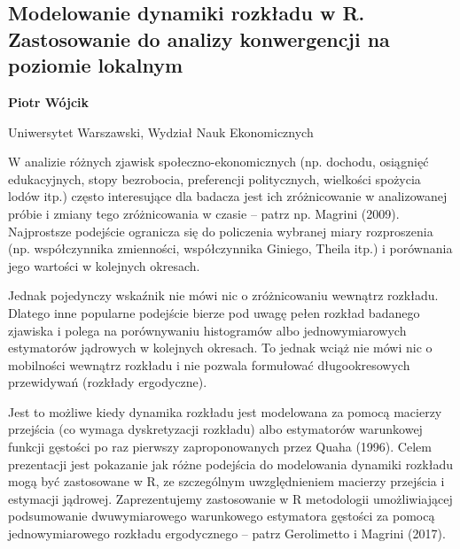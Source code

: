 \documentclass[\main/boa.tex]{subfiles}
\begin{document}
\subsection{Modelowanie dynamiki rozkładu w R. Zastosowanie do analizy konwergencji na poziomie lokalnym}

\begin{minipage}{0.915\textwidth}
	\centering
  {\bf {} Piotr Wójcik}
\end{minipage}


\begin{affiliations}
\begin{minipage}{0.915\textwidth}
\centering
Uniwersytet Warszawski, Wydział Nauk Ekonomicznych  \\[-2pt]
\end{minipage}
\end{affiliations}

\vskip 0.3cm

  W analizie różnych zjawisk społeczno-ekonomicznych (np. dochodu, osiągnięć edukacyjnych, stopy bezrobocia, preferencji politycznych, wielkości spożycia lodów itp.) często interesujące dla badacza jest ich zróżnicowanie w analizowanej próbie i zmiany tego zróżnicowania w czasie – patrz np. Magrini (2009). Najprostsze podejście ogranicza się do policzenia wybranej miary rozproszenia (np. współczynnika zmienności, współczynnika Giniego, Theila itp.) i porównania jego wartości w kolejnych okresach.
  
  Jednak pojedynczy wskaźnik nie mówi nic o zróżnicowaniu wewnątrz rozkładu. Dlatego inne popularne podejście bierze pod uwagę pełen rozkład badanego zjawiska i polega na porównywaniu histogramów albo jednowymiarowych estymatorów jądrowych w kolejnych okresach. To jednak wciąż nie mówi nic o mobilności wewnątrz rozkładu i nie pozwala formułować długookresowych przewidywań (rozkłady ergodyczne).
  
  Jest to możliwe kiedy dynamika rozkładu jest modelowana za pomocą macierzy przejścia (co wymaga dyskretyzacji rozkładu) albo estymatorów warunkowej funkcji gęstości po raz pierwszy zaproponowanych przez Quaha (1996). Celem prezentacji jest pokazanie jak różne podejścia do modelowania dynamiki rozkładu mogą być zastosowane w R, ze szczególnym uwzględnieniem macierzy przejścia i estymacji jądrowej. Zaprezentujemy zastosowanie w R metodologii umożliwiającej podsumowanie dwuwymiarowego warunkowego estymatora gęstości za pomocą jednowymiarowego rozkładu ergodycznego – patrz Gerolimetto i Magrini (2017).
  
\end{document}
